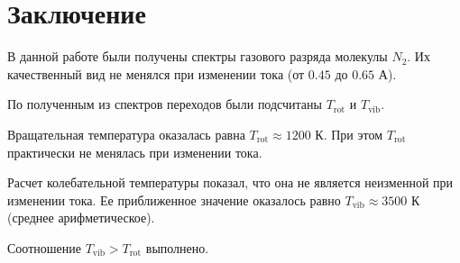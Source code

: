 \clearpage
\section{Заключение}
В данной работе были получены спектры газового разряда молекулы $N_2$. Их качественный вид не менялся при изменении тока (от $0.45$ до $0.65$ А).

По полученным из спектров переходов были подсчитаны $T_\text{rot}$ и $T_\text{vib}$.

Вращательная температура оказалась равна $T_\text{rot} \approx 1200$ К.
При этом $T_\text{rot}$ практически не менялась при изменении тока.

Расчет колебательной температуры показал, что она не является неизменной при изменении тока. Ее приближенное значение оказалось равно $T_\text{vib} \approx 3500$ К (среднее арифметическое).

Соотношение $T_\text{vib} > T_\text{rot}$ выполнено.